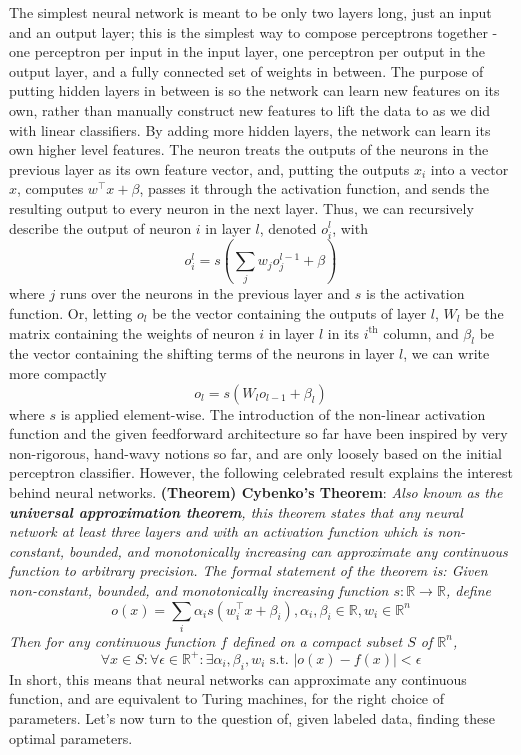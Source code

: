 \documentclass{article}
\begin{document}
The simplest neural network is meant to be only two layers long, just an input and an output layer; this is the simplest way to compose perceptrons together - one perceptron per input in the input layer, one perceptron per output in the output layer, and a fully connected set of weights in between. The purpose of putting hidden layers in between is so the network can learn new features on its own, rather than manually construct new features to lift the data to as we did with linear classifiers. By adding more hidden layers, the network can learn its own higher level features.
\newline
The neuron treats the outputs of the neurons in the previous layer as its own feature vector, and, putting the outputs $ x_i $ into a vector $ x $, computes $ w^\intercal x + \beta $, passes it through the activation function, and sends the resulting output to every neuron in the next layer. Thus, we can recursively describe the output of neuron $ i $ in layer $ l $, denoted $ o_i^l $, with
$$ o_i^l = s \left( \sum_j w_j o_j^{l - 1} + \beta \right) $$
where $ j $ runs over the neurons in the previous layer and $ s $ is the activation function. Or, letting $ o_l $ be the vector containing the outputs of layer $ l $, $ W_l $ be the matrix containing the weights of neuron $ i $ in layer $ l $ in its $ i^{\text{th}} $ column, and $ \beta_l $ be the vector containing the shifting terms of the neurons in layer $ l $, we can write more compactly
$$ o_l = s(W_l o_{l - 1} + \beta_l) $$
where $ s $ is applied element-wise. The introduction of the non-linear activation function and the given feedforward architecture so far have been inspired by very non-rigorous, hand-wavy notions so far, and are only loosely based on the initial perceptron classifier. However, the following celebrated result explains the interest behind neural networks.
\newline \newline
\textbf{(Theorem) Cybenko's Theorem}: \textit{Also known as the \textbf{universal approximation theorem}, this theorem states that any neural network at least three layers and with an activation function which is non-constant, bounded, and monotonically increasing can approximate any continuous function to arbitrary precision. The formal statement of the theorem is: Given non-constant, bounded, and monotonically increasing function $ s: \mathbb{R} \rightarrow \mathbb{R} $, define}
$$ o(x) = \sum_i \alpha_i s(w_i^\intercal x + \beta_i), \alpha_i, \beta_i \in \mathbb{R}, w_i \in \mathbb{R}^n $$
\indent \textit{Then for any continuous function $ f $ defined on a compact subset $ S $ of $ \mathbb{R}^n $,}
$$ \forall x \in S: \forall \epsilon \in \mathbb{R}^+: \exists \alpha_i, \beta_i, w_i \text{ s.t. } | o(x) - f(x) | < \epsilon $$
\newline 
In short, this means that neural networks can approximate any continuous function, and are equivalent to Turing machines, for the right choice of parameters. Let's now turn to the question of, given labeled data, finding these optimal parameters.
\end{document}
